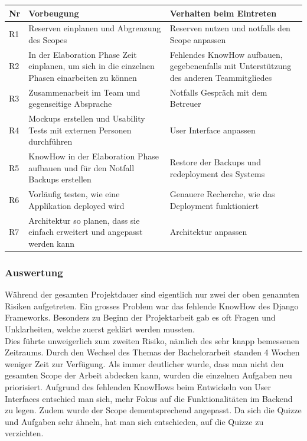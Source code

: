 \renewcommand{\arraystretch}{1.2}
\begin{table}[H]
	\centering
	\begin{tabu} to 0.9\textwidth {l X X}
	\toprule
	Nr & Vorbeugung & Verhalten beim Eintreten \\ 
	\midrule
	R1 & Reserven einplanen und Abgrenzung des Scopes & Reserven nutzen und notfalls den Scope anpassen \\
	R2 & In der Elaboration Phase Zeit einplanen, um sich in die einzelnen Phasen einarbeiten zu können & Fehlendes KnowHow aufbauen, gegebenenfalls mit Unterstützung des anderen Teammitgliedes \\
	R3 & Zusammenarbeit im Team und gegenseitige Absprache & Notfalls Gespräch mit dem Betreuer \\
	R4 & Mockups erstellen und Usability Tests mit externen Personen durchführen & User Interface anpassen \\
	R5 & KnowHow in der Elaboration Phase aufbauen und für den Notfall Backups erstellen & Restore der Backups und redeployment des Systems \\
	R6 & Vorläufig testen, wie eine Applikation deployed wird & Genauere Recherche, wie das Deployment funktioniert \\
	R7 & Architektur so planen, dass sie einfach erweitert und angepasst werden kann & Architektur anpassen \\
	\bottomrule
	\end{tabu}
\end{table}

\subsubsection*{Auswertung}
Während der gesamten Projektdauer sind eigentlich nur zwei der oben genannten Risiken aufgetreten. Ein grosses Problem war das fehlende KnowHow des Django Frameworks. Besonders zu Beginn der Projektarbeit gab es oft Fragen und Unklarheiten, welche zuerst geklärt werden mussten. \\
Dies führte unweigerlich zum zweiten Risiko, nämlich des sehr knapp bemessenen Zeitraums. Durch den Wechsel des Themas der Bachelorarbeit standen 4 Wochen weniger Zeit zur Verfügung. Als immer deutlicher wurde, dass man nicht den gesamten Scope der Arbeit abdecken kann, wurden die einzelnen Aufgaben neu priorisiert. Aufgrund des fehlenden KnowHows beim Entwickeln von User Interfaces entschied man sich, mehr Fokus auf die Funktionalitäten im Backend zu legen. Zudem wurde der Scope dementsprechend angepasst. Da sich die Quizze und Aufgaben sehr ähneln, hat man sich entschieden, auf die Quizze zu verzichten.

